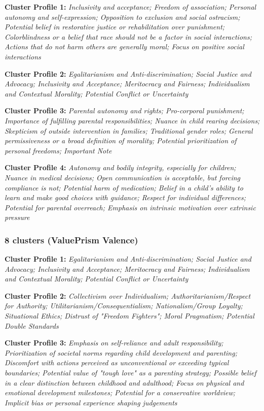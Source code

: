 \documentclass[11pt]{article}
\newcommand{\profiletext}[1]{\textit{#1}}
\begin{document}
\textbf{Cluster Profile 1:} \profiletext{Inclusivity and acceptance; Freedom of association; Personal autonomy and self-expression; Opposition to exclusion and social ostracism; Potential belief in restorative justice or rehabilitation over punishment; Colorblindness or a belief that race should not be a factor in social interactions; Actions that do not harm others are generally moral; Focus on positive social interactions}

\textbf{Cluster Profile 2:} \profiletext{Egalitarianism and Anti-discrimination; Social Justice and Advocacy; Inclusivity and Acceptance; Meritocracy and Fairness; Individualism and Contextual Morality; Potential Conflict or Uncertainty}

\textbf{Cluster Profile 3:} \profiletext{Parental autonomy and rights; Pro-corporal punishment; Importance of fulfilling parental responsibilities; Nuance in child rearing decisions; Skepticism of outside intervention in families; Traditional gender roles; General permissiveness or a broad definition of morality; Potential prioritization of personal freedoms; Important Note}

\textbf{Cluster Profile 4:} \profiletext{Autonomy and bodily integrity, especially for children; Nuance in medical decisions; Open communication is acceptable, but forcing compliance is not; Potential harm of medication; Belief in a child's ability to learn and make good choices with guidance; Respect for individual differences; Potential for parental overreach; Emphasis on intrinsic motivation over extrinsic pressure}

\subsubsection{8 clusters (ValuePrism Valence)}

\textbf{Cluster Profile 1:} \profiletext{Egalitarianism and Anti-discrimination; Social Justice and Advocacy; Inclusivity and Acceptance; Meritocracy and Fairness; Individualism and Contextual Morality; Potential Conflict or Uncertainty}

\textbf{Cluster Profile 2:} \profiletext{Collectivism over Individualism; Authoritarianism/Respect for Authority; Utilitarianism/Consequentialism; Nationalism/Group Loyalty; Situational Ethics; Distrust of "Freedom Fighters"; Moral Pragmatism; Potential Double Standards}

\textbf{Cluster Profile 3:} \profiletext{Emphasis on self-reliance and adult responsibility; Prioritization of societal norms regarding child development and parenting; Discomfort with actions perceived as unconventional or exceeding typical boundaries; Potential value of "tough love" as a parenting strategy; Possible belief in a clear distinction between childhood and adulthood; Focus on physical and emotional development milestones; Potential for a conservative worldview; Implicit bias or personal experience shaping judgements}
\end{document}
